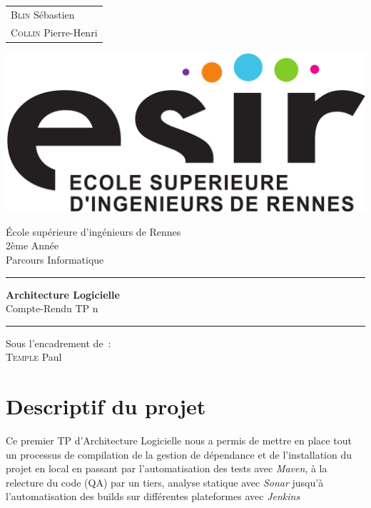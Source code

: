 \documentclass{article}
\begin{document}
\begin{titlepage}
	\vspace{-20px}
	\begin{tabular}{l}
		\textsc{Blin} Sébastien\\
		\textsc{Collin} Pierre-Henri
	\end{tabular}
	\hfill \vspace{10px}\includegraphics[scale=0.1]{../../../esir.png}\\
	\vfill
	\begin{center}
		\Huge{École supérieure d'ingénieurs de Rennes}\\
		\vspace{1cm}
		\LARGE{2ème Année}\\
		\large{Parcours Informatique}\\
		\vspace{0.5cm}\hrule\vspace{0.5cm}
		\LARGE{\textbf{Architecture Logicielle}}\\
		\Large{Compte-Rendu TP n}
		\vspace{0.5cm}\hrule
		\vfill
		\vfill
	\end{center}
	\begin{flushleft}
		\Large{Sous l'encadrement de~:}\\
		\vspace{0.2cm}
		\large{\textsc{Temple} Paul}
	\end{flushleft}
	\vfill
\end{titlepage}

\section{Descriptif du projet}
Ce premier TP d'Architecture Logicielle nous a permis de mettre en place tout un processus de compilation de la gestion de dépendance et de l'installation du projet en local en passant  par l'automatisation des tests avec \emph{Maven}, à la relecture du code (QA) par un tiers, analyse statique avec \emph{Sonar} jusqu'à l'automatisation des builds sur différentes plateformes avec \emph{Jenkins}
\end{document}
